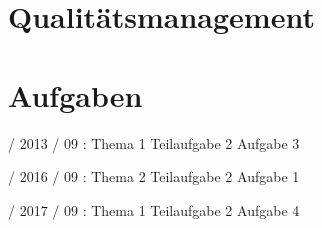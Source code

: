 \documentclass{lehramt-informatik-haupt}
\begin{document}

\chapter{Qualitätsmanagement}


\chapter{Aufgaben}

 / 2013 / 09 : Thema 1 Teilaufgabe 2 Aufgabe 3

%

 / 2016 / 09 : Thema 2 Teilaufgabe 2 Aufgabe 1

%

 / 2017 / 09 : Thema 1 Teilaufgabe 2 Aufgabe 4

\literatur
\end{document}
